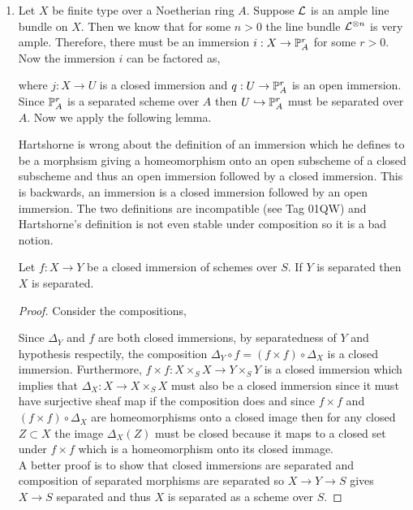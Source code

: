 \documentclass[12pt]{article}
\begin{document}
\begin{enumerate}
\item Let $X$ be finite type over a Noetherian ring $A$. Suppose $\L$ is an ample line bundle on $X$. Then we know that for some $n > 0$ the line bundle $\L^{\otimes n}$ is very ample. Therefore, there must be an immersion $i : X \to \P^r_A$ for some $r > 0$. Now the immersion $i$ can be factored as,
\begin{center}
\end{center} 
where $j : X \to U$ is a closed immersion and $q : U \to \P^r_A$ is an open immersion. Since $\P^r_A$ is a separated scheme over $A$ then $U \embed \P^r_A$ must be separated over $A$. Now we apply the following lemma. 

\begin{remark}
Hartshorne is wrong about the definition of an immersion which he defines to be a morphsism giving a homeomorphism onto an open subscheme of a closed subscheme and thus an open immersion followed by a closed immersion. This is backwards, an immersion is a closed immersion followed by an open immersion. The two definitions are incompatible (see Tag 01QW) and Hartshorne's definition is not even stable under composition so it is a bad notion.  
\end{remark}

\begin{lemma}
Let $f : X \to Y$ be a closed immersion of schemes over $S$. If $Y$ is separated then $X$ is separated.
\end{lemma}

\begin{proof}
Consider the compositions,
\begin{center}
\end{center}
Since $\Delta_Y$ and $f$ are both closed immersions, by separatedness of $Y$ and hypothesis respectily, the composition $\Delta_Y \circ f = (f \times f) \circ \Delta_X$ is a closed immersion. Furthermore, $f \times f : X \times_S X \to Y \times_S Y$ is a closed immersion which implies that $\Delta_X : X \to X \times_S X$ must also be a closed immersion since it must have surjective sheaf map if the composition does and since $f \times f$ and $(f \times f) \circ \Delta_X$ are homeomorphisms onto a closed image then for any closed $Z \subset X$ the image $\Delta_X(Z)$ must be closed because it maps to a closed set under $f \times f$ which is a homeomorphism onto its closed immage.
\bigskip\\
A better proof is to show that closed immersions are separated and composition of separated morphisms are separated so $X \to Y \to S$ gives $X \to S$ separated and thus $X$ is separated as a scheme over $S$.
\end{proof}


\end{enumerate}
\end{document}
